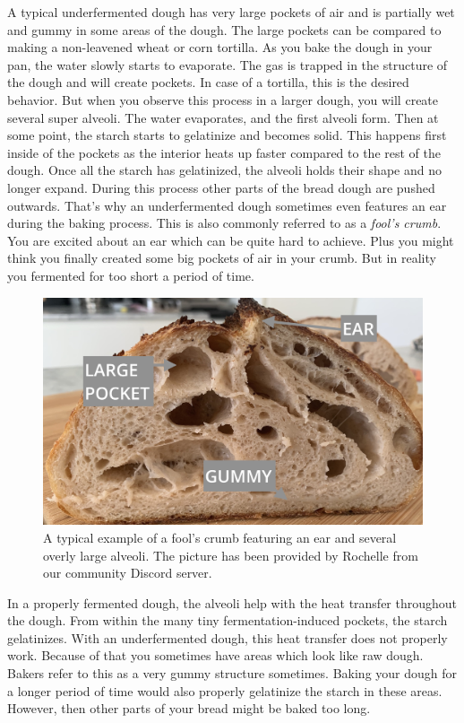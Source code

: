 A typical underfermented dough has very large pockets of air and is partially
wet and gummy in some areas of the dough. The large pockets can be compared
to making a non-leavened wheat or corn tortilla. As you bake the dough in your pan,
the water slowly starts to evaporate. The gas is trapped in the structure of the dough
and will create pockets. In case of a tortilla, this is the desired behavior.
But when you observe this process in a larger dough, you will create several
super alveoli. The water evaporates, and the first alveoli form. Then at some point,
the starch starts to gelatinize and becomes solid. This happens first inside of the pockets
as the interior heats up faster compared to the rest of the dough. Once all the starch
has gelatinized, the alveoli holds their shape and no longer expand. During this
process other parts of the bread dough are pushed outwards. That's why an underfermented
dough sometimes even features an ear during the baking process. This
is also commonly referred to as a {\it fool's crumb}. You are excited about an ear which
can be quite hard to achieve. Plus you might think you finally created some big pockets
of air in your crumb. But in reality you fermented for too short a period
of time.

\begin{figure}
  \includegraphics[width=\textwidth]{fools-crumb}
  \caption{A typical example of a fool's crumb featuring an ear and several overly
  large alveoli. The picture has been provided by Rochelle from our
  community Discord server.}
  \label{fools-crumb}
\end{figure}

In a properly fermented dough, the alveoli help with the heat transfer throughout the dough.
From within the many tiny fermentation-induced pockets, the starch gelatinizes. With
an underfermented dough, this heat transfer does not properly work. Because of that
you sometimes have areas which look like raw dough. Bakers refer to this as a very
gummy structure sometimes. Baking your dough for a longer period of time would also properly
gelatinize the starch in these areas. However, then other parts of your bread
might be baked too long.

